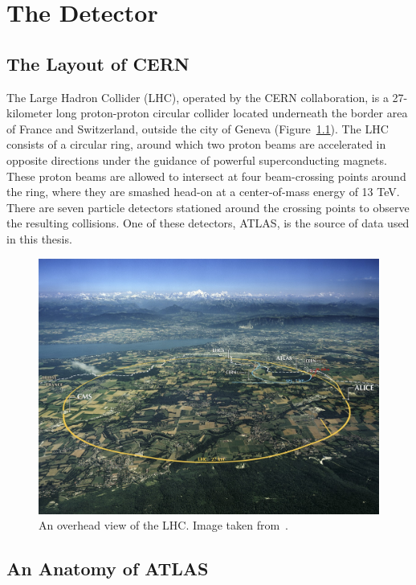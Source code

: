 \chapter{The Detector}

\section{The Layout of CERN}

The Large Hadron Collider (LHC), operated by the CERN collaboration, is a 27-kilometer long proton-proton circular collider located underneath the border area of France and Switzerland, outside the city of Geneva (Figure~\ref{fig:LHC}). The LHC consists of a circular ring, around which two proton beams are accelerated in opposite directions under the guidance of powerful superconducting magnets. These proton beams are allowed to intersect at four beam-crossing points around the ring, where they are smashed head-on at a center-of-mass energy of 13 TeV. There are seven particle detectors stationed around the crossing points to observe the resulting collisions. One of these detectors, ATLAS, is the source of data used in this thesis.

\begin{figure}[htbp]
    \centering
    \includegraphics[width=\linewidth]{Images/ATLAS/LHC.jpg}
    \caption{An overhead view of the LHC. Image taken from~\cite{LHC}.}
    \label{fig:LHC}
\end{figure}

\section{An Anatomy of ATLAS}

